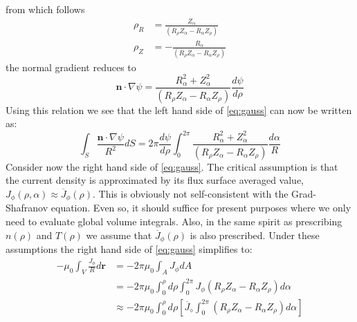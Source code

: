 from which follows
\begin{equation}
	\begin{aligned} 
		\rho _ { R } & = \frac { Z _ { \alpha } } { \left( R _ { \rho } Z _ { \alpha } - R _ { \alpha } Z _ { \rho } \right) } \\ \rho _ { Z } & = - \frac { R _ { \alpha } } { \left( R _ { \rho } Z _ { \alpha } - R _ { \alpha } Z _ { \rho } \right) } 
	\end{aligned}
\end{equation}
the normal gradient reduces to
\begin{equation}
	\mathbf { n } \cdot \nabla \psi = \frac { R _ { \alpha } ^ { 2 } + Z _ { \alpha } ^ { 2 } } { \left( R _ { \rho } Z _ { \alpha } - R _ { \alpha } Z _ { \rho } \right) } \frac { d \psi } { d \rho }
\end{equation}
Using this relation we see that the left hand side of \cref{eq:gauss} can now be written as:
\begin{equation}
	\label{eq:bs_part1}
	\int _ { S } \frac { \mathbf { n } \cdot \nabla \psi } { R ^ { 2 } } d S = 2 \pi \frac { d \psi } { d \rho } \int _ { 0 } ^ { 2 \pi } \frac { R _ { \alpha } ^ { 2 } + Z _ { \alpha } ^ { 2 } } { \left( R _ { \rho } Z _ { \alpha } - R _ { \alpha } Z _ { \rho } \right) } \frac { d \alpha } { R }
\end{equation}
Consider now the right hand side of \cref{eq:gauss}. The critical assumption is that the current density is approximated by its flux surface averaged value, $J _ { \phi } ( \rho , \alpha ) \approx \overline { J } _ { \phi } ( \rho )$. This is obviously not self-consistent with the Grad-Shafranov equation. Even so, it should suffice for present purposes where we only need to evaluate global volume integrals. Also, in the same spirit as prescribing $n(\rho)$ and $T(\rho)$ we assume that $\overline { J } _ { \phi } ( \rho )$ is also prescribed. Under these assumptions the right hand side of \cref{eq:gauss} simplifies to:
\begin{equation}
	\label{eq:bs_part2}
	\begin{aligned} - \mu _ { 0 } \int _ { V } \frac { J _ { \phi } } { R } d \mathbf { r } & = - 2 \pi \mu _ { 0 } \int _ { A } J _ { \phi } d A \\ & = - 2 \pi \mu _ { 0 } \int _ { 0 } ^ { \rho } d \rho \int _ { 0 } ^ { 2 \pi } J _ { \phi } \left( R _ { \rho } Z _ { \alpha } - R _ { \alpha } Z _ { \rho } \right) d \alpha \\ & \approx - 2 \pi \mu _ { 0 } \int _ { 0 } ^ { \rho } d \rho \left[ \overline { J } _ { \diamond } \int _ { 0 } ^ { 2 \pi } \left( R _ { \rho } Z _ { \alpha } - R _ { \alpha } Z _ { \rho } \right) d \alpha \right] \end{aligned}
\end{equation}

